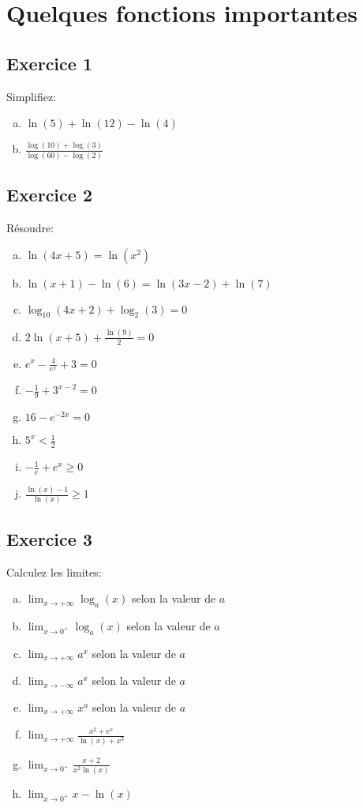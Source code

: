 \chapter{Quelques fonctions importantes}

\section*{Exercice 1}
Simplifiez:
\begin{enumerate}[a)]
    \item $\ln (5)+\ln (12)-\ln (4)$
    \item $\frac{\log (10)+\log (3)}{\log (60)-\log (2)}$
\end{enumerate}

\section*{Exercice 2}
Résoudre:
\begin{enumerate}[a)]
    \item $\ln (4 x+5)=\ln \left(x^2\right)$
    \item $\ln (x+1)-\ln (6)=\ln (3 x-2)+\ln (7)$
    \item $\log _{10}(4 x+2)+\log _2(3)=0$
    \item $2 \ln (x+5)+\frac{\ln (9)}{2}=0$
    \item $e^x-\frac{4}{e^x}+3=0$
    \item $-\frac{1}{9}+3^{x-2}=0$
    \item $16-e^{-2 x}=0$
    \item $5^x<\frac{1}{2}$
    \item $-\frac{1}{e}+e^x \geq 0$
    \item $\frac{\ln (x)-1}{\ln (x)} \geq 1$
\end{enumerate}


\section*{Exercice 3}
Calculez les limites:

\begin{enumerate}[a)]
\item $\lim _{x \rightarrow+\infty} \log _a(x)$ selon la valeur de $a$
\item $\lim _{x \rightarrow 0^{+}} \log _a(x)$ selon la valeur de $a$
\item $\lim _{x \rightarrow+\infty} a^x$ selon la valeur de $a$
\item $\lim _{x \rightarrow-\infty} a^x$ selon la valeur de $a$
\item $\lim _{x \rightarrow+\infty} x^a$ selon la valeur de $a$
\item $\lim _{x \rightarrow+\infty} \frac{x^2+\mathrm{e}^x}{\ln (x)+x^3}$
\item $\lim _{x \rightarrow 0^{+}} \frac{x+2}{x^2 \ln (x)}$
\item $\lim _{x \rightarrow 0^{+}} x-\ln (x)$
\end{enumerate}


